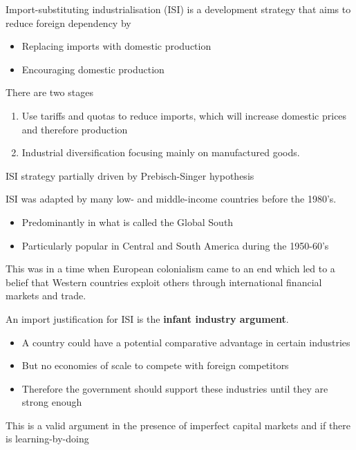 \documentclass{beamer}
\begin{document}
\begin{frame}
 Import-substituting industrialisation (ISI) is a development strategy that aims to reduce foreign dependency by 
 \begin{itemize}
   \item Replacing imports with domestic production
   \item Encouraging domestic production
 \end{itemize}
 \medskip
 There are two stages
 \begin{enumerate}
   \item Use tariffs and quotas to reduce imports, which will increase domestic prices and therefore production
   \item Industrial diversification focusing mainly on manufactured goods.    
 \end{enumerate}
 \medskip
 ISI strategy partially driven by Prebisch-Singer hypothesis
\end{frame}

\begin{frame}
 ISI was adapted by many low- and middle-income countries before the 1980's.
 \begin{itemize}
   \item Predominantly in what is called the Global South
   \item Particularly popular in Central and South America during the 1950-60's
 \end{itemize}
 \medskip
 This was in a time when European colonialism came to an end which led to a belief that Western countries exploit others through international financial markets and trade. 
\end{frame}

\begin{frame}
 An import justification for ISI is the \textbf{infant industry argument}. 
 \begin{itemize}
   \item A country could have a potential comparative advantage in certain industries
   \item But no economies of scale to compete with foreign competitors
   \item Therefore the government should support these industries until they are strong enough
 \end{itemize}
 \medskip
 This is a valid argument in the presence of imperfect capital markets and if there is learning-by-doing
\end{frame}
\end{document}
